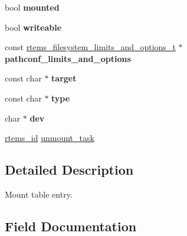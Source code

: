 \begin{DoxyCompactItemize}
bool {\bfseries mounted}
\item 
\mbox{\label{structrtems__filesystem__mount__table__entry__tt_ac6c0a3ceccadd2cab8e8ab2741c46935}} 
bool {\bfseries writeable}
\item 
\mbox{\label{structrtems__filesystem__mount__table__entry__tt_a0ded04b5c8770898e15887cc1d659a6e}} 
const \mbox{\hyperlink{structrtems__filesystem__limits__and__options__t}{rtems\+\_\+filesystem\+\_\+limits\+\_\+and\+\_\+options\+\_\+t}} $\ast$ {\bfseries pathconf\+\_\+limits\+\_\+and\+\_\+options}
\item 
\mbox{\label{structrtems__filesystem__mount__table__entry__tt_a027c2a4e540e4f0a03c90eb5279c37e2}} 
const char $\ast$ {\bfseries target}
\item 
\mbox{\label{structrtems__filesystem__mount__table__entry__tt_a290a93f167a68828086987f644e4227f}} 
const char $\ast$ {\bfseries type}
\item 
\mbox{\label{structrtems__filesystem__mount__table__entry__tt_a0a7630eabf909b92fdb2f914c9284fe6}} 
char $\ast$ {\bfseries dev}
\item 
\mbox{\hyperlink{group__ClassicTasks_gab20892b814dced7dd4e5b9bf42becd57}{rtems\+\_\+id}} \mbox{\hyperlink{structrtems__filesystem__mount__table__entry__tt_a1a5e2b11f956c9fe99021e78511692fd}{unmount\+\_\+task}}
\end{DoxyCompactItemize}


\subsection{Detailed Description}
Mount table entry. 

\subsection{Field Documentation}
\mbox{\label{structrtems__filesystem__mount__table__entry__tt_a1a5e2b11f956c9fe99021e78511692fd}} 
